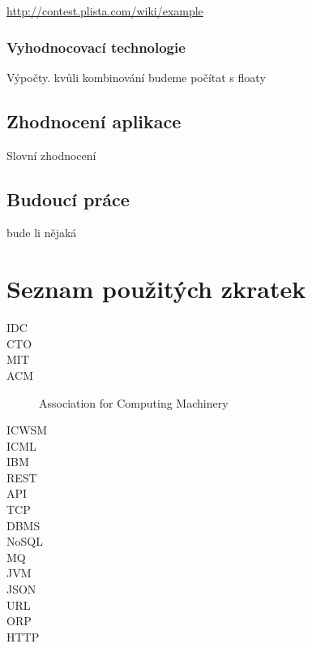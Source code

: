 \documentclass[thesis=M,czech]{FITthesis}[2014/05/07]
\begin{document}
\url{http://contest.plista.com/wiki/example}
	\subsection{Vyhodnocovací technologie}	
	Výpočty. kvůli kombinování budeme počítat s floaty
	

\section{Zhodnocení aplikace}
Slovní zhodnocení
\section{Budoucí práce}
bude li nějaká

\begin{conclusion}
\end{conclusion}




\appendix

\chapter{Seznam použitých zkratek}
\begin{description}
	\item[IDC] 
	\item[CTO]
	\item[MIT]	
	\item[ACM] Association for Computing Machinery	
	\item[ICWSM]	
	\item[ICML]	
	\item[IBM]	
	\item[REST]	
	\item[API]							
	\item[TCP]
	\item[DBMS]
	\item[NoSQL]
	\item[MQ]
	\item[JVM]
	\item[JSON]
	\item[URL]
	\item[ORP]
	\item[HTTP]
\end{description}
\end{document}
